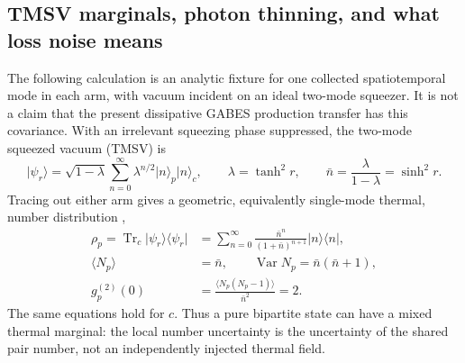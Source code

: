 \documentclass[11pt,a4paper]{article}
\newcommand{\Tr}{\operatorname{Tr}}
\newcommand{\ket}[1]{\lvert #1\rangle}
\newcommand{\ketbra}[2]{\lvert #1\rangle\!\langle #2\rvert}
\begin{document}
\subsection{TMSV marginals, photon thinning, and what loss noise means}
\label{sec:tmsv-loss-statistics}

The following calculation is an analytic fixture for one collected
spatiotemporal mode in each arm, with vacuum incident on an ideal two-mode
squeezer.  It is not a claim that the present dissipative GABES production
transfer has this covariance.  With an irrelevant squeezing phase suppressed,
the two-mode squeezed vacuum (TMSV) is
\begin{equation}
 \ket{\psi_r}=\sqrt{1-\lambda}\sum_{n=0}^{\infty}
 \lambda^{n/2}\ket{n}_p\ket{n}_c,
 \qquad
 \lambda=\tanh^2r,\qquad
 \bar n=\frac{\lambda}{1-\lambda}=\sinh^2r .
 \label{eq:tmsv-fock}
\end{equation}
Tracing out either arm gives a geometric, equivalently single-mode thermal,
number distribution \cite{Xiang2017},
\begin{equation}
 \begin{aligned}
 \rho_p=\Tr_c\ketbra{\psi_r}{\psi_r}
 &=\sum_{n=0}^{\infty}\frac{\bar n^n}{(1+\bar n)^{n+1}}
 \ketbra{n}{n},\\
 \langle N_p\rangle&=\bar n,\qquad
 \operatorname{Var}N_p=\bar n(\bar n+1),\\
 g_p^{(2)}(0)&=\frac{\langle N_p(N_p-1)\rangle}{\bar n^2}=2 .
 \end{aligned}
 \label{eq:tmsv-marginal}
\end{equation}
The same equations hold for $c$.  Thus a pure bipartite state can have a mixed
thermal marginal: the local number uncertainty is the uncertainty of the
shared pair number, not an independently injected thermal field.
\end{document}
